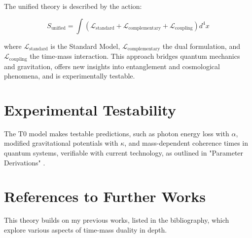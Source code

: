 \documentclass[a4paper,12pt]{article}
\begin{document}
	The unified theory is described by the action:
	
	\begin{equation}
		S_\text{unified} = \int \left( \mathcal{L}_\text{standard} + \mathcal{L}_\text{complementary} + \mathcal{L}_\text{coupling} \right) d^4x
	\end{equation}
	
	where \(\mathcal{L}_\text{standard}\) is the Standard Model, \(\mathcal{L}_\text{complementary}\) the dual formulation, and \(\mathcal{L}_\text{coupling}\) the time-mass interaction. This approach bridges quantum mechanics and gravitation, offers new insights into entanglement and cosmological phenomena, and is experimentally testable.
	
	\section{Experimental Testability}
	
	The T0 model makes testable predictions, such as photon energy loss with \(\alpha\), modified gravitational potentials with \(\kappa\), and mass-dependent coherence times in quantum systems, verifiable with current technology, as outlined in "Parameter Derivations" \cite{pascher_params_2025}.
	
	\section{References to Further Works}
	
	This theory builds on my previous works, listed in the bibliography, which explore various aspects of time-mass duality in depth.
	
\end{document}
